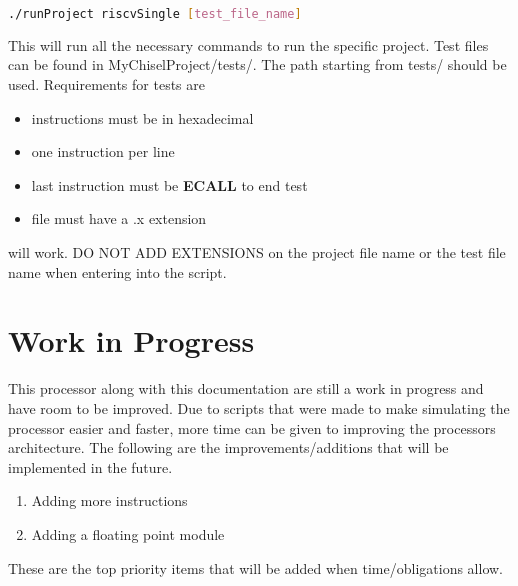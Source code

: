 \documentclass[12pt, letterpaper]{report}
\begin{document}
\begin{lstlisting}[language=bash]
	./runProject riscvSingle [test_file_name]
\end{lstlisting}

This will run all the necessary commands to run the specific project. Test files can be found in MyChiselProject/tests/.
The path starting from tests/ should be used. Requirements for tests are 
\begin{itemize}
	\item instructions must be in hexadecimal
	\item one instruction per line
	\item last instruction must be \textbf{ECALL} to end test
	\item file must have a .x extension
\end{itemize}
will work. DO NOT ADD EXTENSIONS on the project file name or the test file name when entering into the script.  


\section{Work in Progress}
This processor along with this documentation are still a work in progress and have room to be improved.
Due to scripts that were made to make simulating the processor easier and faster, more time can be
given to improving the processors architecture. The following are the improvements/additions that
will be implemented in the future.

\begin{enumerate}
	\item Adding more instructions
	\item Adding a floating point module
\end{enumerate}

\noindent These are the top priority items that will be added when time/obligations allow.
\end{document}
